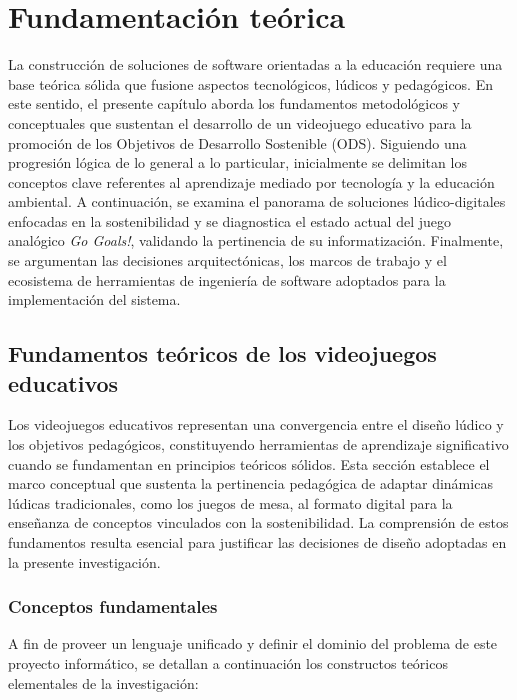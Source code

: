 \chapter{Fundamentación teórica}
\label{chap:chapter1}

La construcción de soluciones de software orientadas a la educación requiere una base teórica sólida que fusione aspectos tecnológicos, lúdicos y pedagógicos. En este sentido, el presente capítulo aborda los fundamentos metodológicos y conceptuales que sustentan el desarrollo de un videojuego educativo para la promoción de los Objetivos de Desarrollo Sostenible (ODS). Siguiendo una progresión lógica de lo general a lo particular, inicialmente se delimitan los conceptos clave referentes al aprendizaje mediado por tecnología y la educación ambiental. A continuación, se examina el panorama de soluciones lúdico-digitales enfocadas en la sostenibilidad y se diagnostica el estado actual del juego analógico \textit{Go Goals!}, validando la pertinencia de su informatización. Finalmente, se argumentan las decisiones arquitectónicas, los marcos de trabajo y el ecosistema de herramientas de ingeniería de software adoptados para la implementación del sistema.

\section{Fundamentos teóricos de los videojuegos educativos}
\label{sec:fundamentos_teoricos}

Los videojuegos educativos representan una convergencia entre el diseño lúdico y los objetivos pedagógicos, constituyendo herramientas de aprendizaje significativo cuando se fundamentan en principios teóricos sólidos. Esta sección establece el marco conceptual que sustenta la pertinencia pedagógica de adaptar dinámicas lúdicas tradicionales, como los juegos de mesa, al formato digital para la enseñanza de conceptos vinculados con la sostenibilidad. La comprensión de estos fundamentos resulta esencial para justificar las decisiones de diseño adoptadas en la presente investigación.

\subsection{Conceptos fundamentales}
\label{subsec:conceptos_fundamentales}

A fin de proveer un lenguaje unificado y definir el dominio del problema de este proyecto informático, se detallan a continuación los constructos teóricos elementales de la investigación:

